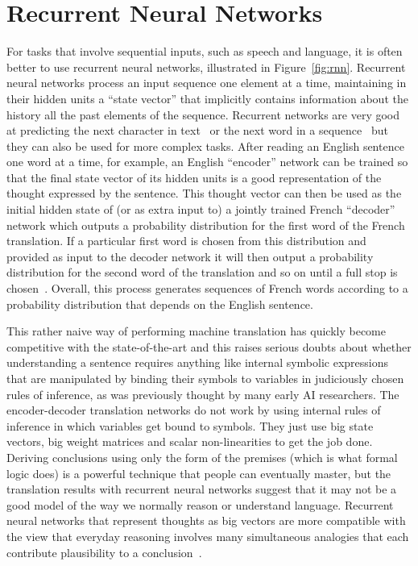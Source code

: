 \documentclass[10pts]{article}
\begin{document}

\section{Recurrent Neural Networks}
\label{sec:rnn}

For tasks that involve sequential inputs, such as speech and language,
it is often better to use recurrent neural networks, illustrated in
Figure~\ref{fig:rnn}.  Recurrent neural networks process an input
sequence one element at a time, maintaining in their hidden units a
``state vector'' that implicitly contains information about the
history all the past elements of the sequence.  Recurrent networks are
very good at predicting the next character in
text~\citep{Sutskever-et-al-ICML2011} or the next word in a
sequence~\citep{Mikolov-et-al-NIPS2013} but they can also be used for
more complex tasks.  After reading an English sentence one word at a
time, for example, an English ``encoder'' network can be trained so
that the final state vector of its hidden units is a good
representation of the thought expressed by the sentence.  This thought
vector can then be used as the initial hidden state of (or as extra
input to) a jointly trained French ``decoder'' network which outputs a
probability distribution for the first word of the French
translation. If a particular first word is chosen from this
distribution and provided as input to the decoder network it will then
output a probability distribution for the second word of the
translation and so on until a full stop is
chosen~\citep{Bahdanau-et-al-arxiv2014,Sutskever-et-al-NIPS2014}.
Overall, this process generates sequences of French words according to
a probability distribution that depends on the English sentence.

This rather naive way of performing machine translation has quickly become
competitive with the state-of-the-art and this raises serious doubts about
whether understanding a sentence requires anything like internal symbolic
expressions that are manipulated by binding their symbols to variables
in judiciously chosen rules of inference, as was previously thought by
many early AI researchers.  The encoder-decoder translation
networks do not work by using internal rules of inference in which
variables get bound to symbols. They just use big state vectors, big weight
matrices and scalar non-linearities to get the job done.  
Deriving conclusions using only the form of the premises (which is
what formal logic does) is a powerful
technique that people can eventually master, but the translation
results with recurrent neural networks suggest that it may not be a good model of
the way we normally reason or understand language. Recurrent neural
networks that represent thoughts as big vectors are more compatible with
the view that everyday reasoning involves many simultaneous analogies that
each contribute plausibility to a 
conclusion~\citep{Lakoff+Johnson-2008,Rogers+McClelland-book2004}.
\end{document}
